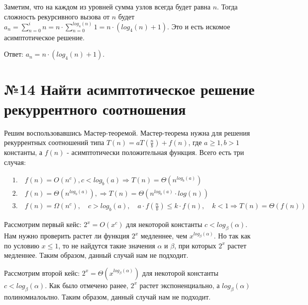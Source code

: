 \documentclass[a4paper,12pt,numbers=noenddot]{scrreprt}
\begin{document}
\begin{flushleft}
Заметим, что на каждом из уровней сумма узлов всегда будет равна $n$. 
Тогда сложность рекурсивного вызова от $n$ будет $a_n=\sum_{n=0}^{i} n = n \cdot \sum_{n=0}^{log_4(n)} 1 = n \cdot (log_4(n)+1)$. Это и есть искомое асимптотическое решение.
\end{flushleft}

\begin{flushleft}
Ответ: $a_n=n \cdot (log_4(n)+1)$.
\end{flushleft}

\section{№14 Найти асимптотическое решение рекуррентного соотношения}

\begin{flushleft}
    Решим воспользовавшись Мастер-теоремой. Мастер-теорема нужна для решения рекуррентных соотношений типа $T(n)=aT(\frac{n}{b}) + f(n)$, где $a \geq 1, b > 1$ константы, а $f(n)$ - асимптотически положительная функция. Всего есть три случая:
\end{flushleft}

\begin{align}
    & 1. \quad f(n) = O(n^{c}), c < log_b(a) \Rightarrow T(n) = \Theta(n^{log_b(a)}) \\&
    2. \quad f(n) = \Theta(n^{log_b(a)}), \Rightarrow T(n) = \Theta(n^{log_b(a)} \cdot log(n)) \\&
    3. \quad f(n) = \Omega(n^{c}), \quad c>log_b(a), \quad a \cdot f \left( \frac{n}{b} \right) \leq k \cdot f(n), \quad k < 1 \Rightarrow T(n) = \Theta(f(n))
\end{align}

\begin{flushleft}
    Рассмотрим первый кейс: $2^x=O(x^c)$ для некоторой константы $c<log_\beta(\alpha)$. Нам нужно проверить растет ли функция $2^x$ медленнее, чем $x^{log_\beta(\alpha)}$. Но так как по условию $x \leq 1$, то не найдутся такие значения $\alpha$ и $\beta$, при которых $2^x$ растет медленнее. Таким образом, данный случай нам не подходит.
\end{flushleft}

\begin{flushleft}
    Рассмотрим второй кейс: $2^x=\Theta(x^{log_\beta(\alpha)})$ для некоторой константы $c<log_\beta(\alpha)$. Как было отмечено ранее, $2^x$ растет экспоненциально, а $log_\beta(\alpha)$ полиномиалоьлно. Таким образом, данный случай нам не подходит.
\end{flushleft}
\end{document}
